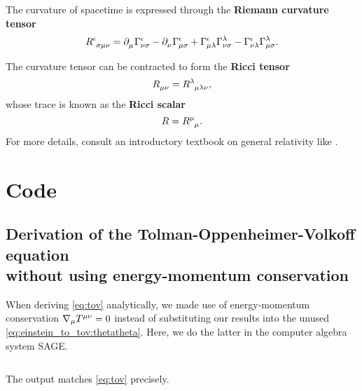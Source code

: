 The curvature of spacetime is expressed through the \textbf{Riemann curvature tensor}
\begin{equation}
	R\indices{^\epsilon_\sigma_\mu_\nu} =
	\partial\indices{_\mu} \Gamma^\epsilon_{\nu \sigma} -
	\partial\indices{_\nu} \Gamma^{\epsilon}_{\mu \sigma} +
	\Gamma^\epsilon_{\mu \lambda} \Gamma^{\lambda}_{\nu \sigma} -
	\Gamma^\epsilon_{\nu \lambda} \Gamma^{\lambda}_{\mu \sigma} .
	\label{eq:def_riemann_tensor}
\end{equation}

The curvature tensor can be contracted to form the \textbf{Ricci tensor}
\begin{equation}
	R\indices{_\mu_\nu} = R\indices{^\lambda_\mu_\lambda_\nu},
	\label{eq:def_ricci_tensor}
\end{equation}
whose trace is known as the \textbf{Ricci scalar}
\begin{equation}
	R = R\indices{^\mu_\mu} .
	\label{eq:def_ricci_scalar}
\end{equation}
For more details, consult an introductory textbook on general relativity like \cite{ref:carroll}.

\chapter{Code}

\section{Derivation of the Tolman-Oppenheimer-Volkoff equation \texorpdfstring{\\}{} without using energy-momentum conservation}
\label{sec:tov_cas_derivation}

When deriving \cref{eq:tov} analytically, we made use of energy-momentum conservation $\nabla_\mu T\indices{^\mu^\nu} = 0$ instead of substituting our results into the unused \cref{eq:einstein_to_tov:thetatheta}.
Here, we do the latter in the computer algebra system SAGE.

\inputminted{python}{../code/einstein_to_tov/ein.sage}

The output matches \cref{eq:tov} precisely.
